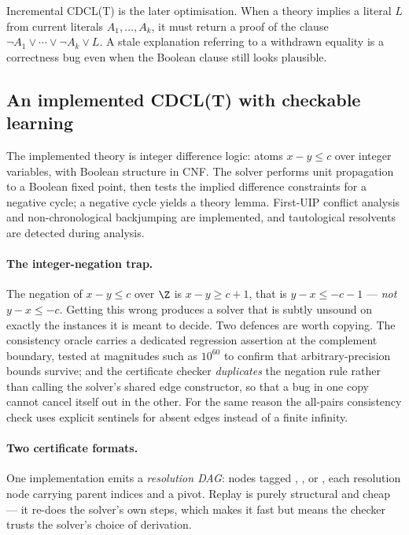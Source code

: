 Incremental CDCL(T) is the later optimisation. When a theory implies a literal
$L$ from current literals $A_1,\ldots,A_k$, it must return a proof of the clause
$\neg A_1\lor\cdots\lor\neg A_k\lor L$. A stale explanation referring to a
withdrawn equality is a correctness bug even when the Boolean clause still looks
plausible.

\subsection{An implemented CDCL(T) with checkable learning}

The implemented theory is integer difference logic: atoms $x-y\le c$ over
integer variables, with Boolean structure in CNF. The solver performs unit
propagation to a Boolean fixed point, then tests the implied difference
constraints for a negative cycle; a negative cycle yields a theory lemma. First-UIP
conflict analysis and non-chronological backjumping are implemented, and
tautological resolvents are detected during analysis.

\paragraph{The integer-negation trap.}
The negation of $x-y\le c$ over $\Z$ is $x-y\ge c+1$, that is $y-x\le -c-1$ ---
\emph{not} $y-x\le -c$. Getting this wrong produces a solver that is subtly
unsound on exactly the instances it is meant to decide. Two defences are worth
copying. The consistency oracle carries a dedicated regression assertion at the
complement boundary, tested at magnitudes such as $10^{60}$ to confirm that
arbitrary-precision bounds survive; and the certificate checker \emph{duplicates}
the negation rule rather than calling the solver's shared edge constructor, so
that a bug in one copy cannot cancel itself out in the other. For the same
reason the all-pairs consistency check uses explicit  sentinels for
absent edges instead of a finite infinity.

\paragraph{Two certificate formats.}
One implementation emits a \emph{resolution DAG}: nodes tagged
, , or , each resolution node carrying
parent indices and a pivot. Replay is purely structural and cheap --- it re-does
the solver's own steps, which makes it fast but means the checker trusts the
solver's choice of derivation.

